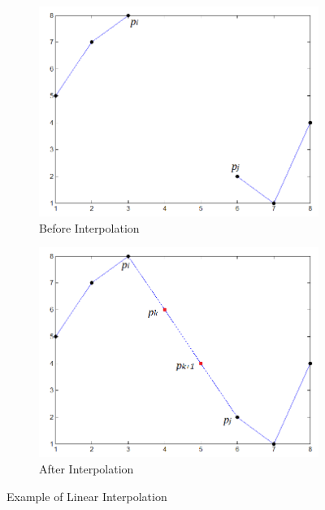 \documentclass[a4paper,12pt]{article}
\begin{document}
\begin{figure}[!ht]
\centering
\begin{subfigure}{0.49\textwidth}
 \centering
 \label{fig4a}
 \includegraphics[scale=0.45]{interp1}
 \caption{Before Interpolation}
\end{subfigure}
\hfill 
\begin{subfigure}{0.49\textwidth}
 \centering
 \label{fig4b}
 \includegraphics[scale=0.45]{interp2}
 \caption{After Interpolation}
\end{subfigure}
\caption{Example of Linear Interpolation}
\label{fig:fig4}
\end{figure}
\end{document}
